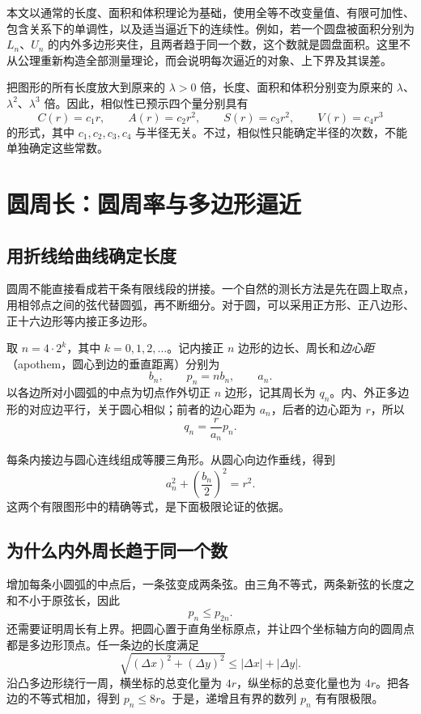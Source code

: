 \documentclass[UTF8,12pt,a4paper,fontset=fandol]{ctexart}
\begin{document}
本文以通常的长度、面积和体积理论为基础，使用全等不改变量值、有限可加性、包含关系下的单调性，以及适当逼近下的连续性。例如，若一个圆盘被面积分别为 $L_n$、$U_n$ 的内外多边形夹住，且两者趋于同一个数，这个数就是圆盘面积。这里不从公理重新构造全部测量理论，而会说明每次逼近的对象、上下界及其误差。

把图形的所有长度放大到原来的 $\lambda>0$ 倍，长度、面积和体积分别变为原来的 $\lambda$、$\lambda^2$、$\lambda^3$ 倍。因此，相似性已预示四个量分别具有
\[
  C(r)=c_1r,\qquad A(r)=c_2r^2,\qquad
  S(r)=c_3r^2,\qquad V(r)=c_4r^3
\]
的形式，其中 $c_1,c_2,c_3,c_4$ 与半径无关。不过，相似性只能确定半径的次数，不能单独确定这些常数。

\section{圆周长：圆周率与多边形逼近}
\label{sec:cs-circumference}

\subsection{用折线给曲线确定长度}

圆周不能直接看成若干条有限线段的拼接。一个自然的测长方法是先在圆上取点，用相邻点之间的弦代替圆弧，再不断细分。对于圆，可以采用正方形、正八边形、正十六边形等内接正多边形。

取 $n=4\cdot2^k$，其中 $k=0,1,2,\ldots$。记内接正 $n$ 边形的边长、周长和\emph{边心距}（apothem，圆心到边的垂直距离）分别为
\[
  b_n,\qquad p_n=nb_n,\qquad a_n.
\]
以各边所对小圆弧的中点为切点作外切正 $n$ 边形，记其周长为 $q_n$。内、外正多边形的对应边平行，关于圆心相似；前者的边心距为 $a_n$，后者的边心距为 $r$，所以
\begin{equation}\label{eq:cs-polygon-perimeters}
  q_n=\frac{r}{a_n}p_n.
\end{equation}

每条内接边与圆心连线组成等腰三角形。从圆心向边作垂线，得到
\begin{equation}\label{eq:cs-apothem}
  a_n^2+\left(\frac{b_n}{2}\right)^2=r^2.
\end{equation}
这两个有限图形中的精确等式，是下面极限论证的依据。

\subsection{为什么内外周长趋于同一个数}

增加每条小圆弧的中点后，一条弦变成两条弦。由三角不等式，两条新弦的长度之和不小于原弦长，因此
\[
  p_n\leq p_{2n}.
\]
还需要证明周长有上界。把圆心置于直角坐标原点，并让四个坐标轴方向的圆周点都是多边形顶点。任一条边的长度满足
\[
  \sqrt{(\Delta x)^2+(\Delta y)^2}
  \leq |\Delta x|+|\Delta y|.
\]
沿凸多边形绕行一周，横坐标的总变化量为 $4r$，纵坐标的总变化量也为 $4r$。把各边的不等式相加，得到 $p_n\leq8r$。于是，递增且有界的数列 $p_n$ 有有限极限。
\end{document}

